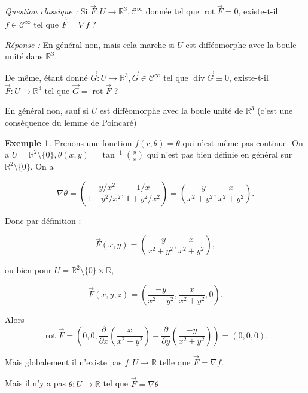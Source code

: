 \documentclass[french]{article}
\theoremstyle{definition}
\newtheorem{protoexemple}{Exemple}[section]
\newenvironment{exemple}
    {\colorlet{shadecolor}{gray!10}\begin{shaded}\begin{protoexemple}}
    {\end{protoexemple}\end{shaded}}
\begin{document}
\emph{Question classique : } Si \(\overrightarrow{F} : U \longrightarrow \mathbb{R}^3, \mathcal{C}^{\infty}\) donnée tel que \(\operatorname{rot}\overrightarrow{F} = 0\), existe-t-il \(f \in \mathcal{C}^{\infty}\) tel que \(\overrightarrow{F} = \nabla f\) ?

\emph{Réponse :} En général non, mais cela marche si \(U\) est difféomorphe avec la boule unité dans \(\mathbb{R}^3\).

De même, étant donné \(\overrightarrow{G} : U \longrightarrow \mathbb{R}^3, \overrightarrow{G} \in \mathcal{C}^{\infty}\) tel que \(\operatorname{div}\overrightarrow{G} \equiv 0\), existe-t-il \(\overrightarrow{F} : U \longrightarrow \mathbb{R}^3\) tel que \(\overrightarrow{G} = \operatorname{rot}\overrightarrow{F}\) ?

En général non, sauf si \(U\) est difféomorphe avec la boule unité de \(\mathbb{R}^3\) (c'est une conséquence du lemme de Poincaré)

\begin{exemple}
  Prenons une fonction \(f(r, \theta) = \theta\) qui n'est même pas continue. On a \(U = \mathbb{R}^2 \setminus \{ 0 \}, \theta(x,y) =  \tan ^{-1}\left(\frac{y}{x}\right)\) qui n'est pas bien définie en général sur \(\mathbb{R}^2 \setminus \{ 0 \}\). On a

  \[\nabla \theta = \left(\frac{- y/x ^2}{1 + y ^2/x ^2}, \frac{1/x}{1 + y ^2 /x ^2}\right) = \left(\frac{-y}{x ^2 + y ^2}, \frac{x}{x ^2 + y ^2}\right).\]

  Donc par définition :

  \[\overrightarrow{F}(x,y) =\left(\frac{-y}{x ^2 + y ^2}, \frac{x}{x ^2 + y ^2}\right), \]

  ou bien pour \(U = \mathbb{R}^2 \setminus \{ 0 \} \times \mathbb{R}\),

  \[\overrightarrow{F}(x,y,z) = \left(\frac{-y}{x ^2 + y ^2}, \frac{x}{x ^2 + y ^2},0\right).\]

  Alors \[\operatorname{rot}\overrightarrow{F} = \left(0,0, \frac{\partial  }{\partial x} \left(\frac{x}{x ^2 + y ^2} \right) - \frac{\partial  }{\partial y}\left(\frac{-y}{x ^2 + y ^2}\right)  \right) = (0,0,0).\]

  Mais globalement il n'existe pas \(f : U \longrightarrow \mathbb{R}\) telle que \(\overrightarrow{F} = \nabla f\).
\end{exemple}



Mais il n'y a pas \(\theta : U \longrightarrow \mathbb{R}\) tel que \(\overrightarrow{F} = \nabla \theta\).
\end{document}
